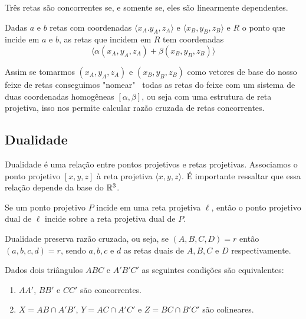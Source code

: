\begin{lem}
Três retas são concorrentes se, e somente se, eles são linearmente dependentes.
\end{lem}

\begin{cor}
Dadas $a$ e $b$ retas com coordenadas $\langle x_A.y_A,z_A \rangle$ e $\langle x_B,y_B,z_B \rangle$ e $R$ o ponto que incide em $a$ e $b$, as retas que incidem em $R$ tem coordenadas \[\langle\alpha(x_A,y_A,z_A) +\beta(x_B,y_B,z_B)\rangle\]
\end{cor}

Assim se tomarmos $(x_A,y_A,z_A)$ e $(x_B,y_B,z_B)$ como vetores de base do nosso feixe de retas conseguimos "nomear" \ todas as retas do feixe com um sistema de duas coordenadas homogêneas $[\alpha,\beta]$, ou seja com uma estrutura de reta projetiva, isso nos permite calcular razão cruzada de retas concorrentes.

\subsection{Dualidade}

Dualidade é uma relação entre pontos projetivos e retas projetivas. Associamos o ponto projetivo $[x, y, z]$ à reta projetiva $\langle x, y, z\rangle$. É importante ressaltar que essa relação depende da base do \(\mathbb{R}^3\).

\begin{prop}
    Se um ponto projetivo $P$ incide em uma reta projetiva $\ell$, então o ponto projetivo dual de $\ell$ incide sobre a reta projetiva dual de $P$.
\end{prop}


\begin{thm}
Dualidade preserva razão cruzada, ou seja, se $(A,B,C,D) = r$ então $(a,b,c,d) = r$, sendo $a,b,c$ e $d$ as retas duais de $A,B,C$ e $D$ respectivamente.
\end{thm}

\begin{thm}
Dados dois triângulos $ABC$ e $A'B'C'$ as seguintes condições são equivalentes:
\begin{enumerate}
    \item $AA'$, $BB'$ e $CC'$ são concorrentes.
    \item $X = AB \cap A'B'$, $Y = AC\cap A'C'$ e $Z = BC \cap B'C'$ são colineares.
\end{enumerate}
\end{thm}

